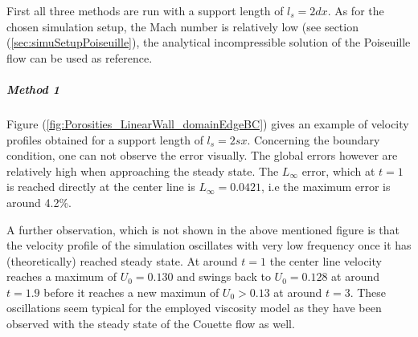 \documentclass[11pt,a4paper,twoside]{report}
\begin{document}
First all three methods are run with a support length of $l_s=2dx$. As for the chosen simulation setup, the Mach number is relatively low (see section (\ref{sec:simuSetupPoiseuille}), the analytical incompressible solution of the Poiseuille flow can be used as reference.



\subparagraph{Method 1}


Figure (\ref{fig:Porosities_LinearWall_domainEdgeBC}) gives an example of velocity profiles obtained for a support length of $l_s=2sx$. Concerning the boundary condition, one can not observe the error visually.
The global errors however are relatively high when approaching the steady state. The $L_\infty$ error, which at $t=1$ is reached directly at the center line is $L_\infty=0.0421$, i.e the maximum error is around 4.2\%. 

A further observation, which is not shown in the above mentioned figure is that the velocity profile of the simulation oscillates with very low frequency once it has (theoretically) reached steady state. At around $t=1$ the center line velocity reaches a maximum of $U_0=0.130$ and swings back to $U_0=0.128$ at around $t=1.9$ before it reaches a new maximun of $U_0>0.13$ at around $t=3$. These oscillations seem typical for the employed viscosity model as they have been observed with the steady state of the Couette flow as well.  


\end{document}

